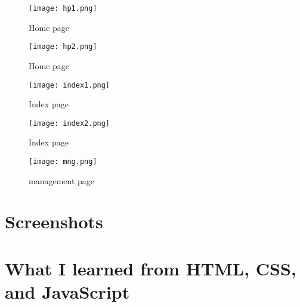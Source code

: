 \documentclass{article}
\begin{document}
\begin{figure}
\texttt{[image: hp1.png]}
\caption{\label{fig:frog}Home page}
\end{figure}

\begin{figure}
\texttt{[image: hp2.png]}
\caption{\label{fig:frog}Home page}
\end{figure}

\begin{figure}
\texttt{[image: index1.png]}
\caption{\label{fig:frog}Index page}
\end{figure}

\begin{figure}
\texttt{[image: index2.png]}
\caption{\label{fig:frog}Index page}
\end{figure}

\begin{figure}
\texttt{[image: mng.png]}
\caption{\label{fig:frog}management page}
\end{figure}

\section{Screenshots}



\section{What I learned from HTML, CSS, and JavaScript}
\end{document}
